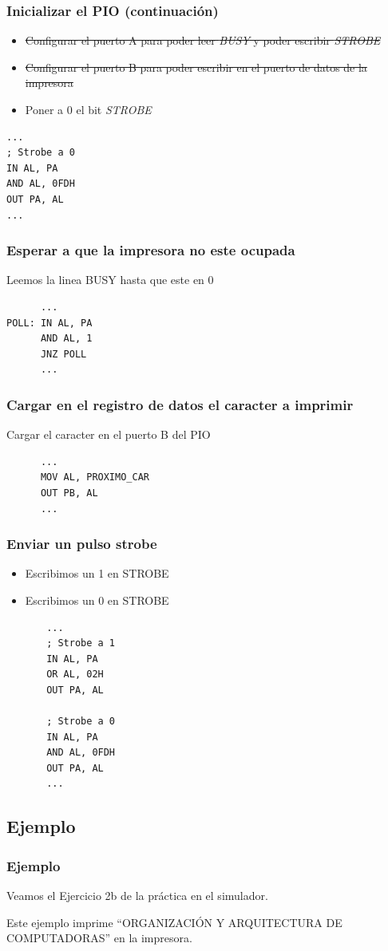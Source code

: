 \documentclass{beamer}
\begin{document}
\begin{frame}[fragile]
\frametitle{Inicializar el PIO (continuación) }
\begin{itemize}
    \item \sout{Configurar el puerto A para poder leer \emph{BUSY} y poder escribir \emph{STROBE}}
    \item \sout{Configurar el puerto B para poder escribir en el puerto de datos de la impresora}
    \item Poner a 0 el bit \emph{STROBE}
\end{itemize}
\begin{block}{}
\begin{verbatim}
...
; Strobe a 0
IN AL, PA 
AND AL, 0FDH
OUT PA, AL
...
\end{verbatim}
\end{block}

\end{frame}


\begin{frame}[fragile]
\frametitle{Esperar a que la impresora no este ocupada}
Leemos la linea BUSY hasta que este en 0
\begin{block}{}
\begin{verbatim}
      ...
POLL: IN AL, PA
      AND AL, 1
      JNZ POLL
      ...
\end{verbatim}
\end{block}
\end{frame}

\begin{frame}[fragile]
\frametitle{Cargar en el registro de datos el caracter a imprimir}
Cargar el caracter en el puerto B del PIO
\begin{block}{}
\begin{verbatim}
      ...
      MOV AL, PROXIMO_CAR
      OUT PB, AL
      ...
\end{verbatim}
\end{block}
\end{frame}

\begin{frame}[fragile]
\frametitle{Enviar un pulso strobe}
\begin{itemize}
    \item Escribimos un 1 en STROBE
    \item Escribimos un 0 en STROBE
\end{itemize}
\begin{block}{}
\begin{verbatim}
       ...
       ; Strobe a 1
       IN AL, PA
       OR AL, 02H
       OUT PA, AL

       ; Strobe a 0
       IN AL, PA
       AND AL, 0FDH
       OUT PA, AL           
       ...
\end{verbatim}
\end{block}

\end{frame}

\subsection{Ejemplo}
\begin{frame}
\frametitle{Ejemplo}
Veamos el Ejercicio 2b de la práctica en el simulador.

Este ejemplo imprime ``ORGANIZACIÓN Y ARQUITECTURA DE COMPUTADORAS'' en la impresora.
\end{frame}
\end{document}
